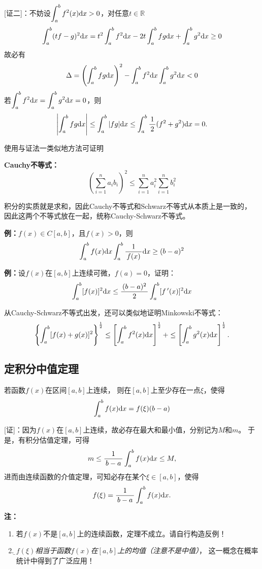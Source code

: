 [证二]：不妨设$\displaystyle\int_a^bf^2(x)\mathrm{d} x>0$，对任意$t\in\mathbb{R}$
$$\displaystyle\int_a^b(tf-g)^2\mathrm{d} x=t^2\displaystyle\int_a^bf^2\mathrm{d} x-2t\displaystyle\int_a^bfg\mathrm{d} x
+\displaystyle\int_a^bg^2\mathrm{d} x\geq 0$$
故必有
$$\Delta=\left(\displaystyle\int_a^bfg\mathrm{d} x\right)^2-\displaystyle\int_a^bf^2\mathrm{d} x\displaystyle\int_a^b
g^2\mathrm{d} x<0$$
若$\displaystyle\int_a^bf^2\mathrm{d} x=\displaystyle\int_a^b g^2\mathrm{d} x=0$，则
$$\left|\displaystyle\int_a^bfg\mathrm{d} x\right|\leq\displaystyle\int_a^b|fg|\mathrm{d} x
\leq\displaystyle\int_a^b\displaystyle\frac{\,{1}\,}{\,{2}\,}(f^2+g^2)\mathrm{d} x=0.$$
\fin

使用与证法一类似地方法可证明
\begin{thx}
	{\bf Cauchy不等式：}
	$$\left(\sum\limits_{i=1}^na_ib_i\right)^2\leq
	\sum\limits_{i=1}^na_i^2\sum\limits_{i=1}^nb_i^2$$
\end{thx}
积分的实质就是求和，因此Cauchy不等式和Schwarz不等式从本质上是一致的，
因此这两个不等式放在一起，统称{\kaishu Cauchy-Schwarz不等式}。

{\bf 例：}$f(x)\in C[a,b]$，且$f(x)>0$，则
$$\displaystyle\int_a^bf(x)\mathrm{d} x\displaystyle\int_a^b\displaystyle\frac{\,{1}\,}{\,{f(x)}\,}\mathrm{d} x\geq(b-a)^2$$

{\bf 例：}设$f(x)$在$[a,b]$上连续可微，$f(a)=0$，证明：
$$\displaystyle\int_a^b[f(x)]^2\mathrm{d} x\leq\displaystyle\frac{\,{(b-a)^2}\,}{\,{2}\,}\displaystyle\int_a^b[f\,'(x)]^2\mathrm{d} x$$

从Cauchy-Schwarz不等式出发，还可以类似地证明{\kaishu Minkowski不等式}：
$$\left\{\displaystyle\int_a^b[f(x)+g(x)]^2\right\}^{\frac12}
\leq\left[\displaystyle\int_a^bf^2(x)\mathrm{d} x\right]^{\frac12}
+\leq\left[\displaystyle\int_a^bg^2(x)\mathrm{d} x\right]^{\frac12}.$$

\subsection{定积分中值定理}

\begin{thx}
	若函数$f(x)$在区间$[a,b]$上连续，
	则在$[a,b]$上至少存在一点$\xi$，使得
	$$\displaystyle\int_a^bf(x)\mathrm{d} x=f(\xi)(b-a)$$
\end{thx}

[证]：因为$f(x)$在$[a,b]$上连续，故必存在最大和最小值，分别记为$M$和$m$。
于是，有积分估值定理，可得
$$m\leq\displaystyle\frac{\,{1}\,}{\,{b-a}\,}\displaystyle\int_a^bf(x)\mathrm{d} x\leq M,$$
进而由连续函数的介值定理，可知必存在某个$\xi\in[a,b]$，使得
$$f(\xi)=\displaystyle\frac{\,{1}\,}{\,{b-a}\,}\displaystyle\int_a^bf(x)\mathrm{d} x.$$
\fin

{\bf 注：}
\begin{enumerate}[(1)]
  \setlength{\itemindent}{1cm}
  \item 若$f(x)$不是$[a,b]$上的连续函数，定理不成立。请自行构造反例！
  \item  {\it\b $f(\xi)$相当于函数$f(x)$在$[a,b]$上的均值（注意不是中值）}，
  这一概念在概率统计中得到了广泛应用！
\end{enumerate}

